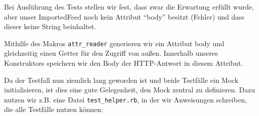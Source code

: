 Bei Ausführung des Tests stellen wir fest, dass zwar die Erwartung erfüllt wurde, aber unser ImportedFeed noch kein Attribut "`body"' besitzt (Fehler) und dass dieser keine String beinhaltet.

\begin{ruby}[label=app/models/job.rb]
 
   
   
      
      
\end{ruby}

Mithilfe des Makros \texttt{attr\_reader} generieren wir ein Attribut body und gleichzeitig einen Getter für den Zugriff von außen. Innerhalb unseres Konstruktors speichern wir den Body der HTTP-Antwort in diesem Attribut.
\tddgreen

Da der Testfall nun ziemlich lang geworden ist und beide Testfälle ein Mock initialisieren, ist dies eine gute Gelegenheit, den Mock zentral zu definieren. Dazu nutzen wir z.B. eine Datei \texttt{test\_helper.rb}, in der wir Anweisungen schreiben, die alle Testfälle nutzen können:
\tddrefactor

\begin{ruby}[label=test/test\_helper.rb]
 
   
      
        
        
        
      
      \PY{o}{[}\PY{o}{]}
      \PY{o}{[}\PY{o}{]}
    \PY{o}{[}\PY{o}{]}
\end{ruby}

